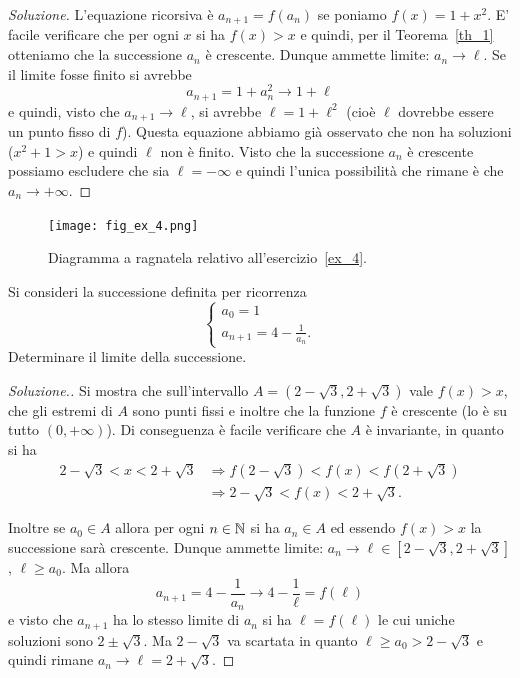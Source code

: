 \begin{proof}[Soluzione]
  L'equazione ricorsiva è $a_{n+1}=f(a_n)$ se poniamo $f(x) = 1+x^2$.
  E' facile verificare che per ogni $x$ si ha $f(x) > x$ e quindi, per
  il Teorema~\ref{th_1} otteniamo che la successione $a_n$ è
  crescente. Dunque ammette limite: $a_n \to \ell$. Se il limite fosse
  finito si avrebbe
  \[
  a_{n+1} = 1 + a_n^2 \to 1 + \ell
  \]
  e quindi, visto che $a_{n+1}\to \ell$, si avrebbe $\ell = 1 +
  \ell^2$ (cioè $\ell$ dovrebbe essere un punto fisso di $f$). Questa
  equazione abbiamo già osservato che non ha soluzioni ($x^2 + 1 > x$)
  e quindi $\ell$ non è finito. Visto che la successione $a_n$ è
  crescente possiamo escludere che sia $\ell=-\infty$ e quindi l'unica
  possibilità che rimane è che $a_n \to +\infty$.
\end{proof}

\begin{figure}
  \begin{center}
  \texttt{[image: fig\_ex\_4.png]}
  \end{center}
  \caption{Diagramma a ragnatela relativo
    all'esercizio~\ref{ex_4}.}
  \label{fig_ex_4}
\end{figure}

\begin{exercise}\label{ex_4}
  Si consideri la successione definita per ricorrenza
  \[
  \begin{cases}
    a_0 = 1\\
    a_{n+1} =4-\frac 1 {a_n}.
  \end{cases}
  \]
  Determinare il limite della successione.
\end{exercise}

\begin{proof}[Soluzione.]
  Si mostra che sull'intervallo $A=(2-\sqrt 3, 2+\sqrt 3)$
  vale $f(x)>x$, che gli estremi di $A$ sono punti fissi
  e inoltre che la funzione $f$ è crescente (lo è su tutto $(0,+\infty)$).
  Di conseguenza è facile verificare che $A$ è invariante, in quanto si ha
  \begin{align*}
  2-\sqrt 3 < x < 2+\sqrt 3 &\Rightarrow
  f(2-\sqrt 3) < f(x) < f(2+\sqrt 3)\\
  &\Rightarrow
  2-\sqrt 3 < f(x) < 2+\sqrt 3.
  \end{align*}

  Inoltre se $a_0 \in A$ allora per ogni $n\in\mathbb N$ si ha $a_n\in A$ ed essendo
  $f(x)>x$ la successione sarà crescente. Dunque ammette
  limite: $a_n \to \ell \in [2-\sqrt 3,2+\sqrt 3]$, $\ell \ge a_0$.
  Ma allora
  \[
  a_{n+1} = 4-\frac 1 {a_n} \to 4 - \frac 1 \ell = f(\ell)
  \]
  e visto che $a_{n+1}$ ha lo stesso limite di $a_n$ si ha $\ell =
  f(\ell)$ le cui uniche soluzioni sono $2\pm \sqrt 3$. Ma $2-\sqrt 3$
  va scartata in quanto $\ell\ge a_0 > 2-\sqrt 3$ e quindi rimane
  $a_n \to \ell = 2+\sqrt 3$.
\end{proof}

